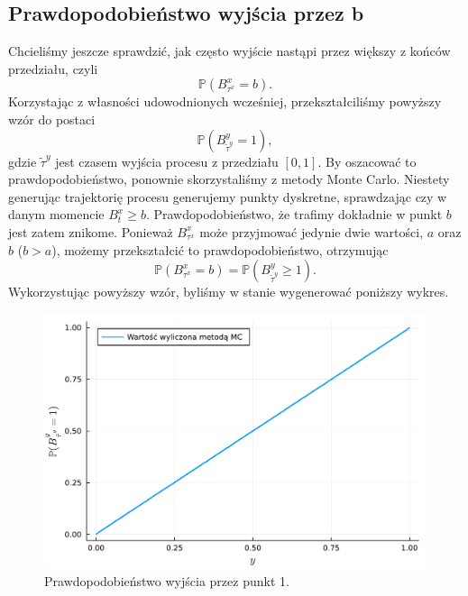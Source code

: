 \documentclass[12pt]{mwart}
\begin{document}
	\subsection{Prawdopodobieństwo wyjścia przez b}
	\noindent Chcieliśmy jeszcze sprawdzić, jak często wyjście nastąpi przez większy z końców przedziału, czyli%
	\begin{equation*}
		\mathbb{P}\left(B^x_{\tau^x}=b\right).
	\end{equation*}
	Korzystając z własności udowodnionych wcześniej, przekształciliśmy powyższy wzór do postaci%
	\begin{equation*}
		\mathbb{P}\left(B^y_{\widetilde\tau^y}=1\right),
	\end{equation*}
	gdzie $\widetilde\tau^y$ jest czasem wyjścia procesu z przedziału $[0, 1]$. By oszacować to prawdopodobieństwo, ponownie skorzystaliśmy z metody Monte Carlo. Niestety generując trajektorię procesu generujemy punkty dyskretne, sprawdzając czy w danym momencie $B^x_t\geqslant b$. Prawdopodobieństwo, że trafimy dokładnie w punkt $b$ jest zatem znikome. Ponieważ $B^x_{\tau^x}$ może przyjmować jedynie dwie wartości, $a$ oraz $b$ ($b>a$), możemy przekształcić to prawdopodobieństwo, otrzymując
	\begin{equation}\label{eq:dyskretyzaction}
		\mathbb{P}\left(B^x_{\tau^x}=b\right)=\mathbb{P}\left(B^y_{\widetilde{\tau}^y}\geqslant1\right).
	\end{equation}
	 Wykorzystując powyższy wzór, byliśmy w stanie wygenerować poniższy wykres.
	\begin{figure}[H]
		\includegraphics[width=\columnwidth]{fig/plot/prob.pdf}
		\caption{Prawdopodobieństwo wyjścia przez punkt 1.}
	\end{figure}
\end{document}

